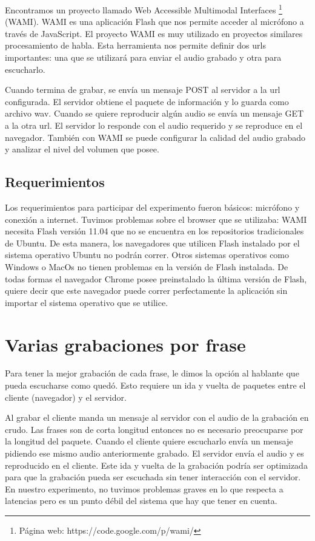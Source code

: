 Encontramos un proyecto llamado Web Accessible Multimodal Interfaces \footnote{Página web: https://code.google.com/p/wami/} (WAMI). WAMI es una aplicación Flash que nos permite acceder al micrófono a través de JavaScript. El proyecto WAMI es muy utilizado en proyectos similares procesamiento de habla. Esta herramienta nos permite definir dos urls importantes: una que se utilizará para enviar el audio grabado y otra para escucharlo.  

Cuando termina de grabar, se envía un mensaje POST al servidor a la url configurada. El servidor obtiene el paquete de información y lo guarda como archivo wav. Cuando se quiere reproducir algún audio se envía un mensaje GET a la otra url. El servidor lo responde con el audio requerido y se reproduce en el navegador. También con WAMI se puede configurar la calidad del audio grabado y analizar el nivel del volumen que posee. 

\subsection{Requerimientos}

Los requerimientos para participar del experimento fueron básicos: micrófono y conexión a internet. Tuvimos problemas sobre el browser que se utilizaba: WAMI necesita Flash versión 11.04 que no se encuentra en los repositorios tradicionales de Ubuntu. De esta manera, los navegadores que utilicen Flash instalado por el sistema operativo Ubuntu no podrán correr. Otros sistemas operativos como Windows o MacOs no tienen problemas en la versión de Flash instalada. De todas formas el navegador Chrome posee preinstalado la última versión de Flash, quiere decir que este navegador puede correr perfectamente la aplicación sin importar el sistema operativo que se utilice.

\section{Varias grabaciones por frase}

Para tener la mejor grabación de cada frase, le dimos la opción al hablante que pueda escucharse como quedó. Esto requiere un ida y vuelta de paquetes entre el cliente (navegador) y el servidor. 

Al grabar el cliente manda un mensaje al servidor con el audio de la grabación en crudo. Las frases son de corta longitud entonces no es necesario preocuparse por la longitud del paquete. Cuando el cliente quiere escucharlo envía un mensaje pidiendo ese mismo audio anteriormente grabado. El servidor envía el audio y es reproducido en el cliente. Este ida y vuelta de la grabación podría ser optimizada para que la grabación pueda ser escuchada sin tener interacción con el servidor. En nuestro experimento, no tuvimos problemas graves en lo que respecta a latencias pero es un punto débil del sistema que hay que tener en cuenta.

